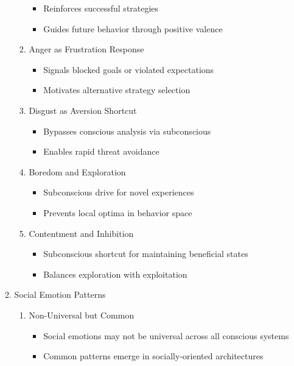 \documentclass[12pt,letterpaper]{article}
\begin{document}
\begin{enumerate}
\begin{enumerate}
\begin{enumerate}
\begin{itemize}
                \item Reinforces successful strategies
                \item Guides future behavior through positive valence
            \end{itemize}
            \item Anger as Frustration Response
            \begin{itemize}
                \item Signals blocked goals or violated expectations
                \item Motivates alternative strategy selection
            \end{itemize}
            \item Disgust as Aversion Shortcut
            \begin{itemize}
                \item Bypasses conscious analysis via subconscious
                \item Enables rapid threat avoidance
            \end{itemize}
            \item Boredom and Exploration
            \begin{itemize}
                \item Subconscious drive for novel experiences
                \item Prevents local optima in behavior space
            \end{itemize}
            \item Contentment and Inhibition
            \begin{itemize}
                \item Subconscious shortcut for maintaining beneficial states
                \item Balances exploration with exploitation
            \end{itemize}
        \end{enumerate}
        \item Social Emotion Patterns
        \begin{enumerate}
            \item Non-Universal but Common
            \begin{itemize}
                \item Social emotions may not be universal across all conscious systems
                \item Common patterns emerge in socially-oriented architectures
            \end{itemize}

\end{enumerate}
\end{enumerate}
\end{enumerate}
\end{document}
